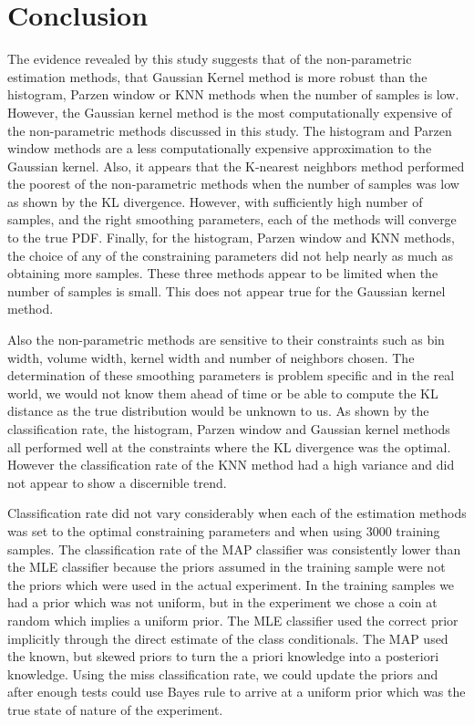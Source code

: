 \documentclass[journal]{IEEEtran}
\begin{document}
\section{Conclusion}
\par The evidence revealed by this study suggests that of the non-parametric estimation methods, that Gaussian Kernel method is more robust than the histogram, Parzen window or KNN methods when the number of samples is low. However, the Gaussian kernel method is the most computationally expensive of the non-parametric methods discussed in this study. The histogram and Parzen window methods are a less computationally expensive approximation to the Gaussian kernel. Also, it appears that the K-nearest neighbors method performed the poorest of the non-parametric methods when the number of samples was low as shown by the KL divergence. However, with sufficiently high number of samples, and the right smoothing parameters, each of the methods will converge to the true PDF. Finally, for the histogram, Parzen window and KNN methods, the choice of any of the constraining parameters did not help nearly as much as obtaining more samples. These three methods appear to be limited when the number of samples is small. This does not appear true for the Gaussian kernel method.
\par Also the non-parametric methods are sensitive to their constraints such as bin width, volume width, kernel width and number of neighbors chosen. The determination of these smoothing parameters is problem specific and in the real world, we would not know them ahead of time or be able to compute the KL distance as the true distribution would be unknown to us. As shown by the classification rate, the histogram, Parzen window and Gaussian kernel methods all performed well at the constraints where the KL divergence was the optimal. However the classification rate of the KNN method had a high variance and did not appear to show a discernible trend.
\par Classification rate did not vary considerably when each of the estimation methods was set to the optimal constraining parameters and when using 3000 training samples. The classification rate of the MAP classifier was consistently lower than the MLE classifier because the priors assumed in the training sample were not the priors which were used in the actual experiment. In the training samples we had a prior which was not uniform, but in the experiment we chose a coin at random which implies a uniform prior. The MLE classifier used the correct prior implicitly through the direct estimate of the class conditionals. The MAP used the known, but skewed priors to turn the a priori knowledge into a posteriori knowledge. Using the miss classification rate, we could update the priors and after enough tests could use Bayes rule to arrive at a uniform prior which was the true state of nature of the experiment.
\end{document}
